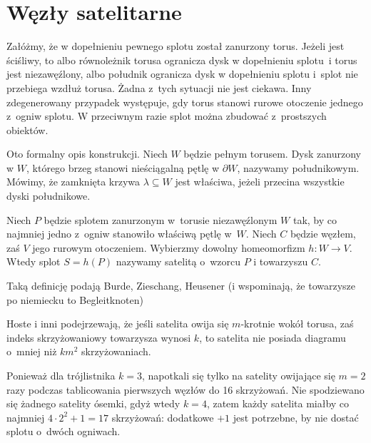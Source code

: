 
\section{Węzły satelitarne}

Załóżmy, że w dopełnieniu pewnego splotu został zanurzony torus.
Jeżeli jest ściśliwy, to albo równoleżnik torusa ogranicza dysk w dopełnieniu splotu~i torus jest niezawęźlony, albo południk ogranicza dysk w dopełnieniu splotu i~splot nie przebiega wzdłuż torusa.
Żadna z~tych sytuacji nie jest ciekawa.
Inny zdegenerowany przypadek występuje, gdy torus stanowi rurowe otoczenie jednego z~ogniw splotu.
W przeciwnym razie splot można zbudować z~prostszych obiektów.

Oto formalny opis konstrukcji.
Niech $W$ będzie pełnym torusem.
Dysk zanurzony w $W$, którego brzeg stanowi nieściągalną pętlę w $\partial W$, nazywamy południkowym.
Mówimy, że zamknięta krzywa $\lambda \subseteq W$ jest właściwa, jeżeli przecina wszystkie dyski południkowe.

\begin{definition}
%
%
%
%
    Niech $P$ będzie splotem zanurzonym w~torusie niezawęźlonym $W$ tak, by co najmniej jedno z~ogniw stanowiło właściwą pętlę w~$W$.
    Niech $C$ będzie węzłem, zaś $V$ jego rurowym otoczeniem.
    Wybierzmy dowolny homeomorfizm $h \colon W \to V$.
    Wtedy splot $S = h(P)$ nazywamy satelitą o~wzorcu $P$ i towarzyszu $C$.
\end{definition}


Taką definicję podają Burde, Zieschang, Heusener \cite[s. 21]{burde2014} (i wspominają, że towarzysze po niemiecku to Begleitknoten)

Hoste i inni \cite{thistlethwaite1998} podejrzewają, że jeśli satelita owija się $m$-krotnie wokół torusa, zaś indeks skrzyżowaniowy towarzysza wynosi $k$, to satelita nie posiada diagramu o~mniej niż $km^2$ skrzyżowaniach.
%
%
%

Ponieważ dla trójlistnika $k = 3$, napotkali się tylko na satelity owijające się $m = 2$ razy podczas tablicowania pierwszych węzłów do 16 skrzyżowań.
Nie spodziewano się żadnego satelity ósemki, gdyż wtedy $k = 4$, zatem każdy satelita miałby co najmniej $4 \cdot 2^2 + 1 = 17$ skrzyżowań: dodatkowe $+1$ jest potrzebne, by nie dostać splotu o~dwóch ogniwach.


